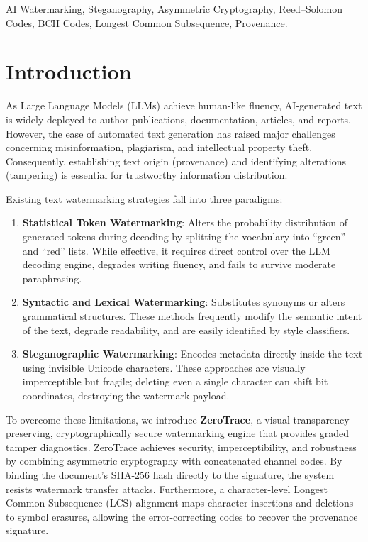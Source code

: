 \documentclass[conference]{IEEEtran}
\begin{document}
\begin{IEEEkeywords}
AI Watermarking, Steganography, Asymmetric Cryptography, Reed--Solomon Codes, BCH Codes, Longest Common Subsequence, Provenance.
\end{IEEEkeywords}

\section{Introduction}
As Large Language Models (LLMs) achieve human-like fluency, AI-generated text is widely deployed to author publications, documentation, articles, and reports. However, the ease of automated text generation has raised major challenges concerning misinformation, plagiarism, and intellectual property theft. Consequently, establishing text origin (provenance) and identifying alterations (tampering) is essential for trustworthy information distribution.

Existing text watermarking strategies fall into three paradigms:
\begin{enumerate}
    \item \textbf{Statistical Token Watermarking}: Alters the probability distribution of generated tokens during decoding by splitting the vocabulary into ``green'' and ``red'' lists. While effective, it requires direct control over the LLM decoding engine, degrades writing fluency, and fails to survive moderate paraphrasing.
    \item \textbf{Syntactic and Lexical Watermarking}: Substitutes synonyms or alters grammatical structures. These methods frequently modify the semantic intent of the text, degrade readability, and are easily identified by style classifiers.
    \item \textbf{Steganographic Watermarking}: Encodes metadata directly inside the text using invisible Unicode characters. These approaches are visually imperceptible but fragile; deleting even a single character can shift bit coordinates, destroying the watermark payload.
\end{enumerate}

To overcome these limitations, we introduce \textbf{ZeroTrace}, a visual-transparency-preserving, cryptographically secure watermarking engine that provides graded tamper diagnostics. ZeroTrace achieves security, imperceptibility, and robustness by combining asymmetric cryptography with concatenated channel codes. By binding the document's SHA-256 hash directly to the signature, the system resists watermark transfer attacks. Furthermore, a character-level Longest Common Subsequence (LCS) alignment maps character insertions and deletions to symbol erasures, allowing the error-correcting codes to recover the provenance signature.
\end{document}
